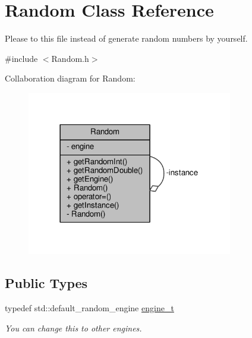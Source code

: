 \hypertarget{classRandom}{}\section{Random Class Reference}
\label{classRandom}


Please to this file instead of generate random numbers by yourself.  




{\ttfamily \#include $<$Random.\+h$>$}



Collaboration diagram for Random\+:
\nopagebreak
\begin{figure}[H]
\begin{center}
\leavevmode
\includegraphics[width=254pt]{classRandom__coll__graph}
\end{center}
\end{figure}
\subsection*{Public Types}
\begin{DoxyCompactItemize}
\item 
typedef std\+::default\+\_\+random\+\_\+engine \hyperlink{classRandom_ab1090b767f3e771eb8f846079869d1b4}{engine\+\_\+t}
\begin{DoxyCompactList}\small\item\em You can change this to other engines. \end{DoxyCompactList}\end{DoxyCompactItemize}
